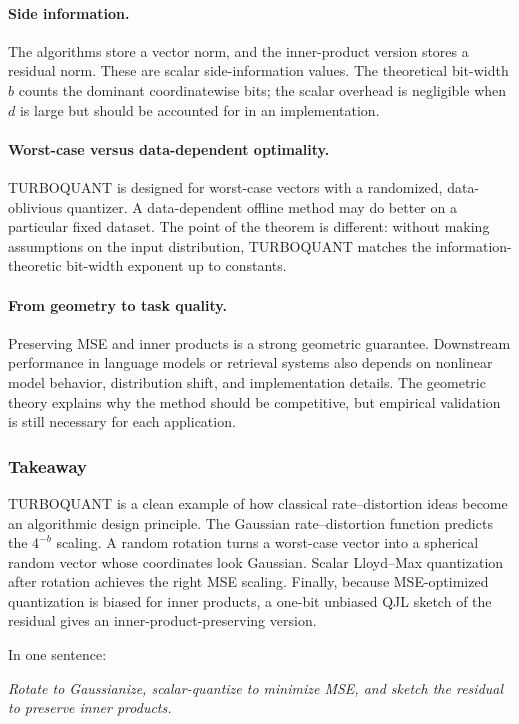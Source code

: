 \paragraph{Side information.}
The algorithms store a vector norm, and the inner-product version stores a residual norm.
These are scalar side-information values.
The theoretical bit-width $b$ counts the dominant coordinatewise bits; the scalar overhead is negligible when $d$ is large but should be accounted for in an implementation.

\paragraph{Worst-case versus data-dependent optimality.}
TURBOQUANT is designed for worst-case vectors with a randomized, data-oblivious quantizer.
A data-dependent offline method may do better on a particular fixed dataset.
The point of the theorem is different: without making assumptions on the input distribution, TURBOQUANT matches the information-theoretic bit-width exponent up to constants.

\paragraph{From geometry to task quality.}
Preserving MSE and inner products is a strong geometric guarantee.
Downstream performance in language models or retrieval systems also depends on nonlinear model behavior, distribution shift, and implementation details.
The geometric theory explains why the method should be competitive, but empirical validation is still necessary for each application.

\subsubsection*{Takeaway}

TURBOQUANT is a clean example of how classical rate--distortion ideas become an algorithmic design principle.
The Gaussian rate--distortion function predicts the $4^{-b}$ scaling.
A random rotation turns a worst-case vector into a spherical random vector whose coordinates look Gaussian.
Scalar Lloyd--Max quantization after rotation achieves the right MSE scaling.
Finally, because MSE-optimized quantization is biased for inner products, a one-bit unbiased QJL sketch of the residual gives an inner-product-preserving version.

In one sentence:
\begin{center}
\emph{Rotate to Gaussianize, scalar-quantize to minimize MSE, and sketch the residual to preserve inner products.}
\end{center}
